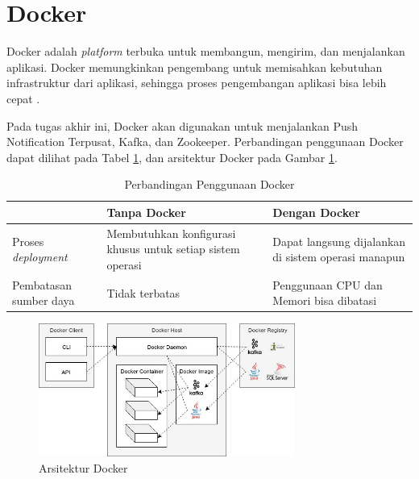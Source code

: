 \section{Docker}
\par Docker adalah \textit{platform} terbuka untuk membangun, mengirim, dan menjalankan aplikasi. Docker memungkinkan pengembang untuk memisahkan kebutuhan infrastruktur dari aplikasi, sehingga proses pengembangan aplikasi bisa lebih cepat \cite{docker-online}.
\par Pada tugas akhir ini, Docker akan digunakan untuk menjalankan Push Notification Terpusat, Kafka, dan Zookeeper. Perbandingan penggunaan Docker dapat dilihat pada Tabel \ref{t:perbandingan_docker}, dan arsitektur Docker pada Gambar \ref{img:arsitektur-docker}.
\begin{longtable}{|p{2.5cm}|p{3.5cm}|p{3.5cm}|}
	\caption{Perbandingan Penggunaan Docker} \label{t:perbandingan_docker} \\ \hline
	\rowcolor{lightgray} & Tanpa Docker & Dengan Docker \\ \hline
	Proses \textit{deployment} & Membutuhkan konfigurasi khusus untuk setiap sistem operasi & Dapat langsung dijalankan di sistem operasi manapun \\ \hline
	Pembatasan sumber daya & Tidak terbatas & Penggunaan CPU dan Memori bisa dibatasi \\ \hline
\end{longtable}
\begin{figure}[H]
\centering\includegraphics[width=0.75\textwidth]{bab2/img/arsitektur-docker.jpg}
\caption{Arsitektur Docker}
\label{img:arsitektur-docker}
\end{figure}


